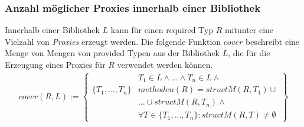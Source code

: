 \documentclass[a4paper,12pt]{article}
\begin{document}
\subsubsection{Anzahl möglicher Proxies innerhalb einer Bibliothek}
Innerhalb einer Bibliothek $L$ kann für einen required Typ $R$ mitunter eine Vielzahl von \emph{Proxies} erzeugt werden. 
Die folgende Funktion $\mathit{cover}$ beschreibt eine Menge von Mengen von provided Typen aus der Bibliothek $L$, die für die Erzeugung eines Proxies für $R$ verwendet werden können.
\begin{gather*}
cover(R,L) := 
\left\{\begin{array}{l|l}
					& T_1 \in L \wedge \text{...} \wedge T_n \in L 								\wedge \mathit{ }\\
\{T_1,...,T_n\}		& \mathit{methoden(R)} = \mathit{structM(R,T_1)}							\cup \mathit{ }\\
					& \texttt{...} \cup \mathit{structM(R, T_n)} 								\wedge \mathit{ }\\
					& \forall T \in \{T_1,...,T_n\}:											\mathit{structM(R,T)} \neq \emptyset
\end{array}\right\}
\end{gather*}
\noindent
\end{document}
